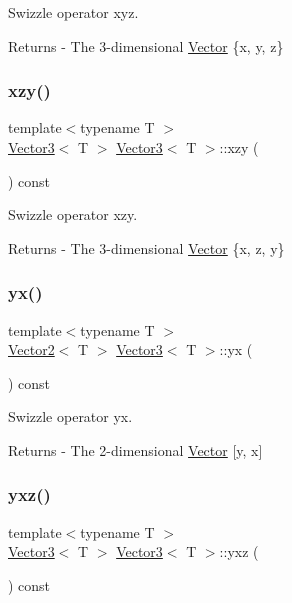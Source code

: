 Swizzle operator xyz. \begin{DoxyReturn}{Returns}
-\/ The 3-\/dimensional \mbox{\hyperlink{class_vector}{Vector}} \{x, y, z\} 
\end{DoxyReturn}
\mbox{\label{class_vector3_a890a30bec732a65aaae386eb21d393df}} 
\subsubsection{\texorpdfstring{xzy()}{xzy()}}
{\footnotesize\ttfamily template$<$typename T $>$ \\
\mbox{\hyperlink{class_vector3}{Vector3}}$<$ T $>$ \mbox{\hyperlink{class_vector3}{Vector3}}$<$ T $>$\+::xzy (\begin{DoxyParamCaption}{ }\end{DoxyParamCaption}) const}

Swizzle operator xzy. \begin{DoxyReturn}{Returns}
-\/ The 3-\/dimensional \mbox{\hyperlink{class_vector}{Vector}} \{x, z, y\} 
\end{DoxyReturn}
\mbox{\label{class_vector3_a136e95915dd535fd5dafec54814bd460}} 
\subsubsection{\texorpdfstring{yx()}{yx()}}
{\footnotesize\ttfamily template$<$typename T $>$ \\
\mbox{\hyperlink{class_vector2}{Vector2}}$<$ T $>$ \mbox{\hyperlink{class_vector3}{Vector3}}$<$ T $>$\+::yx (\begin{DoxyParamCaption}{ }\end{DoxyParamCaption}) const}

Swizzle operator yx. \begin{DoxyReturn}{Returns}
-\/ The 2-\/dimensional \mbox{\hyperlink{class_vector}{Vector}} \mbox{[}y, x\mbox{]} 
\end{DoxyReturn}
\mbox{\label{class_vector3_ab026847d50c092c8ccf5c5314edca3db}} 
\subsubsection{\texorpdfstring{yxz()}{yxz()}}
{\footnotesize\ttfamily template$<$typename T $>$ \\
\mbox{\hyperlink{class_vector3}{Vector3}}$<$ T $>$ \mbox{\hyperlink{class_vector3}{Vector3}}$<$ T $>$\+::yxz (\begin{DoxyParamCaption}{ }\end{DoxyParamCaption}) const}

